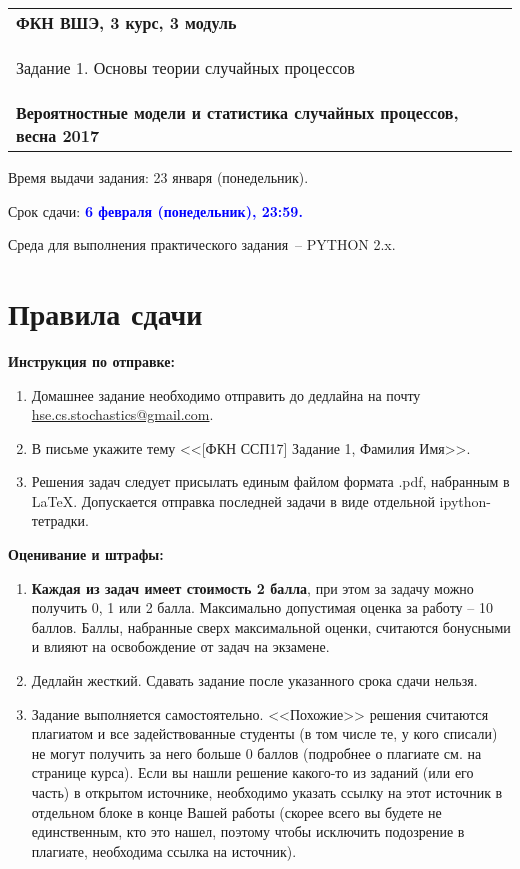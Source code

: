 \documentclass[a4paper,14pt]{extreport}
\renewcommand{\=}[1]{\stackrel{#1}{=}} %
\begin{document}
\begin{center}
    \begin{tabular}{|p{15.5cm}|}
        \hline
        \textbf{ФКН ВШЭ, 3 курс, 3 модуль}\\
        \begin{center} \Large Задание 1. Основы теории случайных процессов
        \end{center}\\
        \textbf{Вероятностные модели и статистика случайных процессов, весна 2017}\\
        \hline
    \end{tabular}
\end{center}

Время выдачи задания: 23 января (понедельник).

Срок сдачи: \textcolor{blue}{\bf 6 февраля (понедельник), 23:59.}

Среда для выполнения практического задания~-- PYTHON 2.x.

\section*{Правила сдачи}

\textbf{Инструкция по отправке:} 
\begin{enumerate}
\item Домашнее задание необходимо отправить
до дедлайна на почту \href{mailto:hse.cs.stochastics@gmail.com}
{hse.cs.stochastics@gmail.com}.
\item В письме укажите тему 
<<[ФКН ССП17] Задание 1, Фамилия Имя>>.
\item Решения задач следует присылать единым файлом
формата .pdf, набранным в \LaTeX. Допускается отправка
последней задачи в виде отдельной ipython-тетрадки.
\end{enumerate}

\textbf{Оценивание и штрафы:} 
\begin{enumerate}
\item \textbf{Каждая из задач имеет стоимость 2 балла}, при этом
за задачу можно получить 0, 1 или 2 балла.
Максимально допустимая оценка за работу -- 10 баллов. 
Баллы, набранные сверх максимальной оценки, 
считаются бонусными и влияют на освобождение от задач на экзамене.
\item Дедлайн жесткий. Сдавать задание после указанного
срока сдачи нельзя.
\item Задание выполняется самостоятельно.
<<Похожие>> решения считаются плагиатом и все задействованные студенты (в том числе те, у кого списали) не могут получить за него больше 0 баллов (подробнее о плагиате см. на странице курса). Если вы нашли решение какого-то из заданий (или его часть) в открытом источнике, необходимо указать ссылку на этот источник в отдельном блоке в конце Вашей работы (скорее всего вы будете не единственным, кто это нашел, поэтому чтобы исключить подозрение в плагиате, необходима ссылка на источник).
\end{enumerate}
\end{document}
